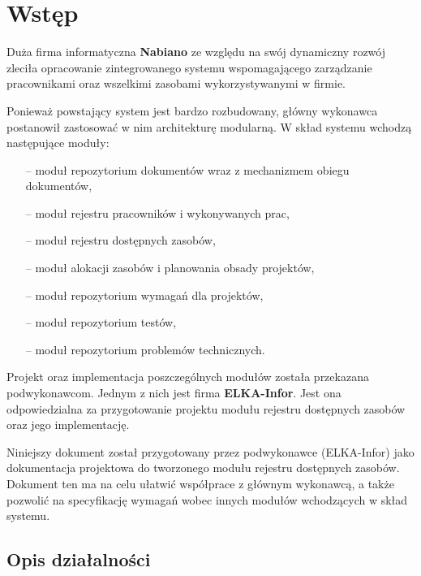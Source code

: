 \section{Wstęp}

Duża firma informatyczna {\bf Nabiano} ze względu na swój dynamiczny
rozwój zleciła opracowanie zintegrowanego systemu wspomagającego
zarządzanie pracownikami oraz wszelkimi zasobami wykorzystywanymi w
firmie.

Ponieważ powstający system jest bardzo rozbudowany, główny wykonawca
postanowił zastosować w nim architekturę modularną. W skład systemu
wchodzą następujące moduły:

\begin{itemize}
\item[--] moduł repozytorium dokumentów wraz z mechanizmem obiegu dokumentów,
\item[--] moduł rejestru pracowników i wykonywanych prac,
\item[--] moduł rejestru dostępnych zasobów,
\item[--] moduł alokacji zasobów i planowania obsady projektów,
\item[--] moduł repozytorium wymagań dla projektów,
\item[--] moduł repozytorium testów,
\item[--] moduł repozytorium problemów technicznych.
\end{itemize}

Projekt oraz implementacja poszczególnych modułów została przekazana
podwykonawcom. Jednym z nich jest firma {\bf ELKA-Infor}. Jest ona
odpowiedzialna za przygotowanie projektu modułu rejestru dostępnych
zasobów oraz jego implementację.

Niniejszy dokument został przygotowany przez podwykonawce (ELKA-Infor)
jako dokumentacja projektowa do tworzonego modułu rejestru dostępnych
zasobów. Dokument ten ma na celu ułatwić współprace z głównym
wykonawcą, a także pozwolić na specyfikację wymagań wobec innych
modułów wchodzących w skład systemu.

\subsection{Opis działalności}


